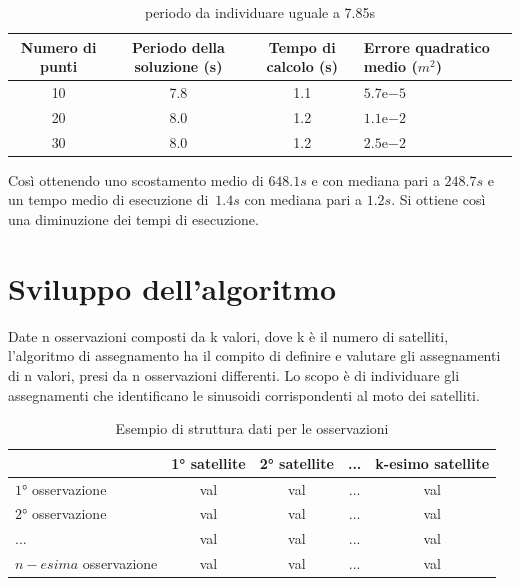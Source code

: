 \documentclass[a4paper,12pt]{report}
\newcommand{\expnumber}[2]{{#1}\mathrm{e}{#2}}
\begin{document}
\begin{itemize}
      \begin{table}[H]
        \caption{periodo da individuare uguale a 7.85s}
        \begin{center}
          \label{tab:limiteInf_2}
          \begin{tabularx}{\textwidth}{SSSp{0.5\textwidth}}
            \toprule
            {Numero di punti} & {Periodo della soluzione (s)} & {Tempo di calcolo (s)} & {Errore quadratico \newline medio ($m^2$)}\\
            \midrule
            10 &  7.8  & 1.1 & $\expnumber{5.7}{-5}$\\
            20 &  8.0 & 1.2 & $\expnumber{1.1}{-2}$\\
            30 &  8.0 & 1.2 & $\expnumber{2.5}{-2}$\\
            \bottomrule
          \end{tabularx}
        \end{center}
      \end{table}
\end{itemize}

Così ottenendo uno scostamento medio di $648.1s$ e con mediana pari a $248.7s$ e un tempo medio di esecuzione di~$1.4s$ con mediana pari a $1.2s$.
Si ottiene così una diminuzione dei tempi di esecuzione.

\chapter{Sviluppo dell'algoritmo}
Date n osservazioni composti da k valori, dove k è il numero di satelliti, l'algoritmo di assegnamento ha il compito di definire e valutare gli assegnamenti di n valori, presi da n osservazioni differenti. Lo scopo è di individuare gli assegnamenti che identificano le sinusoidi corrispondenti al moto dei satelliti.

\begin{table}[H]
  \caption{Esempio di struttura dati per le osservazioni}
  \label{tab:osservazioni}
  \center
    \begin{tabular}{lcccc}
      \toprule
      {} & {\ang{1} satellite} & {\ang{2} satellite} & {...} & {k-esimo satellite}\\
      \midrule
      $\ang{1}$ osservazione & val & val & ... & val \\
      $\ang{2}$ osservazione & val & val & ... & val  \\
      ...                    & val & val & ... & val \\
      $n-esima$ osservazione & val & val & ... & val \\
      \bottomrule
    \end{tabular}
\end{table}
\end{document}
